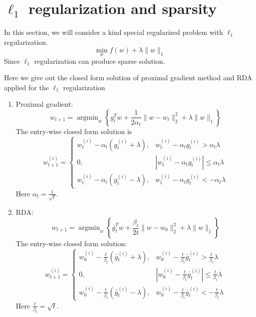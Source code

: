 \section{$\ell_1$ regularization and sparsity}
In this section, we will consider a kind special regularized problem with $\ell_1$ regularization.
\begin{equation}
	\min_w f(w)+\lambda \|w\|_1
\end{equation}
Since $\ell_1$ regularization can produce sparse solution.

Here we give out the closed form solution of proximal gradient method and RDA applied for the $\ell_1$ regularization


\begin{enumerate}
	\item Proximal gradient:
	\begin{equation}
		w_{t+1}=\mathop{\arg \min}_w \left\lbrace g_t^T w+\frac{1}{2\alpha_t} \|w-w_t\|^2_2 +\lambda \|w\|_1 \right \rbrace
	\end{equation}
	The entry-wise closed form solution is
	\begin{equation}
		w_{t+1}^{(i)}=
		\begin{cases}
			w_t^{(i)}-\alpha_t (g_t^{(i)} +\lambda), & w_t^{(i)}-\alpha_t g_t^{(i)} > \alpha_t \lambda\\
			0, & |w_t^{(i)}-\alpha_t g_t^{(i)}| \leq \alpha_t \lambda\\
			w_t^{(i)}-\alpha_t (g_t^{(i)} -\lambda), & w_t^{(i)}-\alpha_t g_t^{(i)} < -\alpha_t \lambda
		\end{cases}
	\end{equation}
	Here $\alpha_t=\frac{1}{\sqrt{t}}$.
	
	\item RDA:
	\begin{equation}
		w_{t+1}=\mathop{\arg \min}_w \left\lbrace \bar g_t^T w+\frac{\beta_t}{2t} \|w-w_0\|^2_2 +\lambda \|w\|_1 \right \rbrace
	\end{equation}
	The entry-wise closed form solution:
	\begin{equation}
		w_{t+1}^{(i)}=
		\begin{cases}
			w_0^{(i)}-\frac{t}{\beta_t} (\bar g_t^{(i)} +\lambda), & w_0^{(i)}-\frac{t}{\beta_t}\bar g_t^{(i)} > \frac{t}{\beta_t}\lambda\\
			0, & | w_0^{(i)}-\frac{t}{\beta_t}\bar g_t^{(i)}| \leq  \frac{t}{\beta_t} \lambda\\
			w_0^{(i)}-\frac{t}{\beta_t} (\bar g_t^{(i)} -\lambda), & w_0^{(i)}-\frac{t}{\beta_t}\bar g_t^{(i)} < - \frac{t}{\beta_t}\lambda
		\end{cases}
	\end{equation}
	Here $\frac{t}{\beta_t}=\sqrt{t}$.
	

\end{enumerate}
